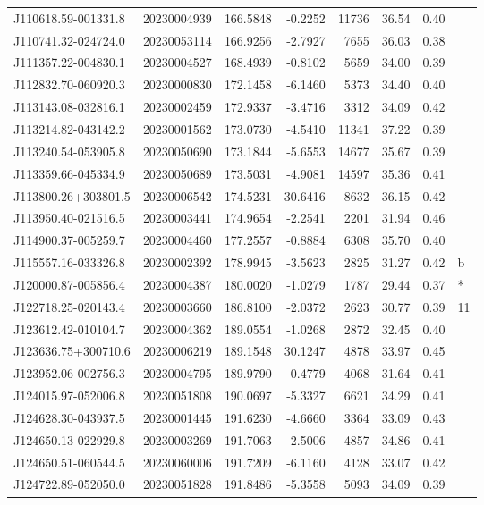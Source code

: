 \documentclass{article}
\begin{document}
\begin {longtable}{|l|l|r|r|r|r|r|l|}
 J110618.59-001331.8&  20230004939&  166.5848&   -0.2252& 11736& 36.54& 0.40&\\
 J110741.32-024724.0&  20230053114&  166.9256&   -2.7927&  7655& 36.03& 0.38&\\
 J111357.22-004830.1&  20230004527&  168.4939&   -0.8102&  5659& 34.00& 0.39&\\
 J112832.70-060920.3&  20230000830&  172.1458&   -6.1460&  5373& 34.40& 0.40&\\
 J113143.08-032816.1&  20230002459&  172.9337&   -3.4716&  3312& 34.09& 0.42&\\
 J113214.82-043142.2&  20230001562&  173.0730&   -4.5410& 11341& 37.22& 0.39&\\
 J113240.54-053905.8&  20230050690&  173.1844&   -5.6553& 14677& 35.67& 0.39&\\
 J113359.66-045334.9&  20230050689&  173.5031&   -4.9081& 14597& 35.36& 0.41&\\
 J113800.26+303801.5&  20230006542&  174.5231&   30.6416&  8632& 36.15& 0.42&\\
 J113950.40-021516.5&  20230003441&  174.9654&   -2.2541&  2201& 31.94& 0.46&\\
 J114900.37-005259.7&  20230004460&  177.2557&   -0.8884&  6308& 35.70& 0.40&\\
 J115557.16-033326.8&  20230002392&  178.9945&   -3.5623&  2825& 31.27& 0.42&b\\%
 J120000.87-005856.4&  20230004387&  180.0020&   -1.0279&  1787& 29.44& 0.37&*\\
 J122718.25-020143.4&  20230003660&  186.8100&   -2.0372&  2623& 30.77& 0.39&11\\%
 J123612.42-010104.7&  20230004362&  189.0554&   -1.0268&  2872& 32.45& 0.40&\\
 J123636.75+300710.6&  20230006219&  189.1548&   30.1247&  4878& 33.97& 0.45&\\
 J123952.06-002756.3&  20230004795&  189.9790&   -0.4779&  4068& 31.64& 0.41&\\
 J124015.97-052006.8&  20230051808&  190.0697&   -5.3327&  6621& 34.29& 0.41&\\
 J124628.30-043937.5&  20230001445&  191.6230&   -4.6660&  3364& 33.09& 0.43&\\
 J124650.13-022929.8&  20230003269&  191.7063&   -2.5006&  4857& 34.86& 0.41&\\
 J124650.51-060544.5&  20230060006&  191.7209&   -6.1160&  4128& 33.07& 0.42&\\
 J124722.89-052050.0&  20230051828&  191.8486&   -5.3558&  5093& 34.09& 0.39&\\

\end{longtable}
\end{document}
